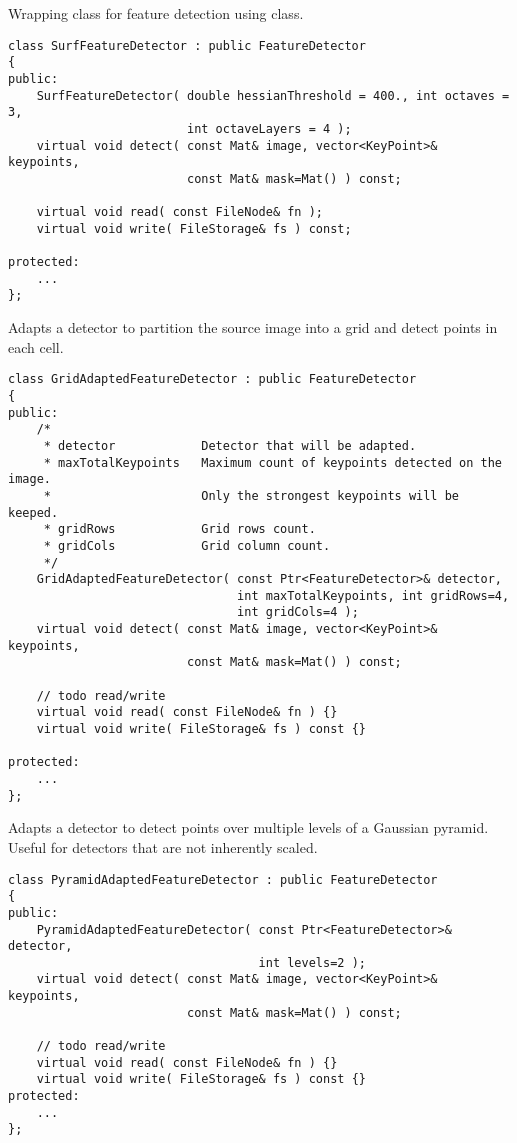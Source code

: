 Wrapping class for feature detection using  class.

\begin{lstlisting}
class SurfFeatureDetector : public FeatureDetector
{
public:
    SurfFeatureDetector( double hessianThreshold = 400., int octaves = 3,
                         int octaveLayers = 4 );
    virtual void detect( const Mat& image, vector<KeyPoint>& keypoints, 
                         const Mat& mask=Mat() ) const;
                         
    virtual void read( const FileNode& fn );
    virtual void write( FileStorage& fs ) const;

protected:
	...
};
\end{lstlisting}

Adapts a detector to partition the source image into a grid and detect 
points in each cell.

\begin{lstlisting}
class GridAdaptedFeatureDetector : public FeatureDetector
{
public:
    /*
     * detector            Detector that will be adapted.
     * maxTotalKeypoints   Maximum count of keypoints detected on the image. 
     *                     Only the strongest keypoints will be keeped.
     * gridRows            Grid rows count.
     * gridCols            Grid column count.
     */
    GridAdaptedFeatureDetector( const Ptr<FeatureDetector>& detector, 
                                int maxTotalKeypoints, int gridRows=4, 
                                int gridCols=4 );
    virtual void detect( const Mat& image, vector<KeyPoint>& keypoints, 
                         const Mat& mask=Mat() ) const;

    // todo read/write
    virtual void read( const FileNode& fn ) {}
    virtual void write( FileStorage& fs ) const {}

protected:
    ...
};
\end{lstlisting}

Adapts a detector to detect points over multiple levels of a Gaussian
pyramid. Useful for detectors that are not inherently scaled.

\begin{lstlisting}
class PyramidAdaptedFeatureDetector : public FeatureDetector
{
public:
    PyramidAdaptedFeatureDetector( const Ptr<FeatureDetector>& detector, 
                                   int levels=2 );
    virtual void detect( const Mat& image, vector<KeyPoint>& keypoints, 
                         const Mat& mask=Mat() ) const;

    // todo read/write
    virtual void read( const FileNode& fn ) {}
    virtual void write( FileStorage& fs ) const {}
protected:
    ...
};
\end{lstlisting}



